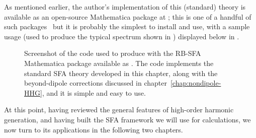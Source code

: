 As mentioned earlier, the author's implementation of this (standard) theory is available as an open-source Mathematica package at ; this is one of a handful of such packages~\cite{rhyno_thesis, rhyno_code, hhgmax_thesis, hhgmax_code, slimp_paper, ClassSTRONG_paper} but it is probably the simplest to install and use, with a sample usage (used to produce the typical spectrum shown in ) displayed below in .




\begin{figure}[htbp]
  \centering
  \captionsetup{width=0.96\textwidth}
  \caption[
  Sample screenshot of the RBSFA code used to calculate HHG spectra
  ]{
  Screenshot of the code used to produce  with the RB-SFA Mathematica package available as . The code implements the standard SFA theory developed in this chapter, along with the beyond-dipole corrections discussed in chapter~\ref{chap:nondipole-HHG}, and it is simple and easy to use.
  }
\label{f7-RBSFA-screenshot}
\end{figure}


At this point, having reviewed the general features of high-order harmonic generation, and having built the SFA framework we will use for calculations, we now turn to its applications in the following two chapters.
































